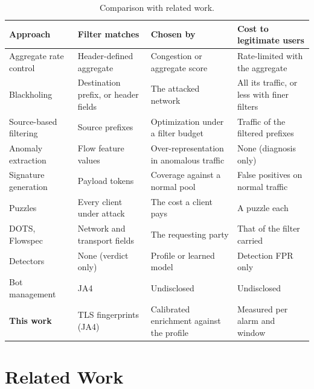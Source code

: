 \documentclass[conference,letterpaper,10pt]{IEEEtran}
\newcommand\1{\textit{(i)}}
\newcommand\2{\textit{(ii)}}
\newcommand\3{\textit{(iii)}}
\newcommand\4{\textit{(iv)}}
\newcommand\5{\textit{(v)}}
\newcommand\6{\textit{(vi)}}
\newcommand\7{\textit{(vii)}}
\newcommand\8{\textit{(viii)}}
\newcommand\9{\textit{(ix)}}
\begin{document}
\begin{table}[t]
\centering
\caption{Comparison with related work.}
\label{tab:related}
\footnotesize
\setlength{\tabcolsep}{4pt}
\begin{tabular}{@{}llll@{}}
\toprule
\textbf{Approach} & \textbf{Filter matches} & \textbf{Chosen by} & \textbf{Cost to legitimate users} \\
\midrule
Aggregate rate control~\cite{mahajan2002pushback,alcoz2022accturbo} & Header-defined aggregate & Congestion or aggregate score & Rate-limited with the aggregate \\
Blackholing~\cite{dietzel2018stellar} & Destination prefix, or header fields & The attacked network & All its traffic, or less with finer filters \\
Source-based filtering~\cite{soldo2012filtering} & Source prefixes & Optimization under a filter budget & Traffic of the filtered prefixes \\
Anomaly extraction~\cite{silveira2010urca,brauckhoff2009extraction} & Flow feature values & Over-representation in anomalous traffic & None (diagnosis only) \\
Signature generation~\cite{li2006hamsa} & Payload tokens & Coverage against a normal pool & False positives on normal traffic \\
Puzzles~\cite{kandula2005botz} & Every client under attack & The cost a client pays & A puzzle each \\
DOTS, Flowspec~\cite{dots2020data,rfc8955flowspec} & Network and transport fields & The requesting party & That of the filter carried \\
Detectors~\cite{bharathi2012pca,kemp2023approach,belcastro2025klage} & None (verdict only) & Profile or learned model & Detection FPR only \\
Bot management~\cite{martinetti2024ja4signals} & JA4 & Undisclosed & Undisclosed \\
\textbf{This work} & TLS fingerprints (JA4) & Calibrated enrichment against the profile & Measured per alarm and window \\
\bottomrule
\end{tabular}
\end{table}

\section{Related Work}
\end{document}
